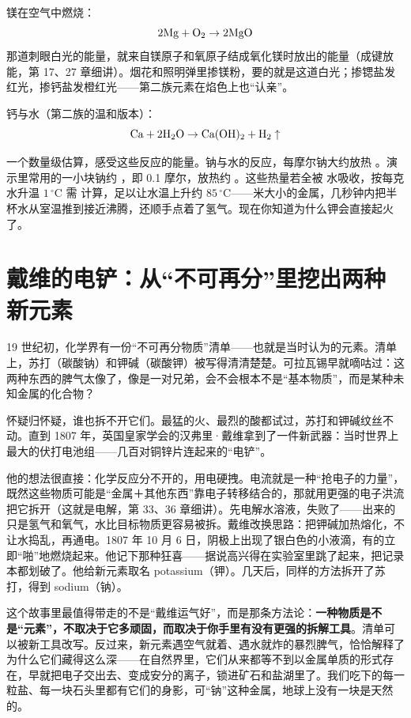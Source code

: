 镁在空气中燃烧：
\[\mathrm{2Mg} + \mathrm{O_2} \rightarrow \mathrm{2MgO}\]
那道刺眼白光的能量，就来自镁原子和氧原子结成氧化镁时放出的能量（成键放能，第 17、27 章细讲）。烟花和照明弹里掺镁粉，要的就是这道白光；掺锶盐发红光，掺钙盐发橙红光——第二族元素在焰色上也“认亲”。

钙与水（第二族的温和版本）：
\[\mathrm{Ca} + \mathrm{2H_2O} \rightarrow \mathrm{Ca(OH)_2} + \mathrm{H_2}\uparrow\]

一个数量级估算，感受这些反应的能量。钠与水的反应，每摩尔钠大约放热 。演示里常用的一小块钠约 ，即 0.1 摩尔，放热约 。这些热量若全被  水吸收，按每克水升温 $1\,^{\circ}\mathrm{C}$ 需  计算，足以让水温上升约 $85\,^{\circ}\mathrm{C}$——米大小的金属，几秒钟内把半杯水从室温推到接近沸腾，还顺手点着了氢气。现在你知道为什么钾会直接起火了。

\section{戴维的电铲：从“不可再分”里挖出两种新元素}

\begin{zhengju}
19 世纪初，化学界有一份“不可再分物质”清单——也就是当时认为的元素。清单上，苏打（碳酸钠）和钾碱（碳酸钾）被写得清清楚楚。可拉瓦锡早就嘀咕过：这两种东西的脾气太像了，像是一对兄弟，会不会根本不是“基本物质”，而是某种未知金属的化合物？

怀疑归怀疑，谁也拆不开它们。最猛的火、最烈的酸都试过，苏打和钾碱纹丝不动。直到 1807 年，英国皇家学会的汉弗里·戴维拿到了一件新武器：当时世界上最大的伏打电池组——几百对铜锌片连起来的“电铲”。

他的想法很直接：化学反应分不开的，用电硬拽。电流就是一种“抢电子的力量”，既然这些物质可能是“金属＋其他东西”靠电子转移结合的，那就用更强的电子洪流把它拆开（这就是电解，第 33、36 章细讲）。先电解水溶液，失败了——出来的只是氢气和氧气，水比目标物质更容易被拆。戴维改换思路：把钾碱加热熔化，不让水捣乱，再通电。1807 年 10 月 6 日，阴极上出现了银白色的小液滴，有的立即“啪”地燃烧起来。他记下那种狂喜——据说高兴得在实验室里跳了起来，把记录本都划破了。他给新元素取名 potassium（钾）。几天后，同样的方法拆开了苏打，得到 sodium（钠）。

这个故事里最值得带走的不是“戴维运气好”，而是那条方法论：\textbf{一种物质是不是“元素”，不取决于它多顽固，而取决于你手里有没有更强的拆解工具}。清单可以被新工具改写。反过来，新元素遇空气就着、遇水就炸的暴烈脾气，恰恰解释了为什么它们藏得这么深——在自然界里，它们从来都等不到以金属单质的形式存在，早就把电子交出去、变成安分的离子，锁进矿石和盐湖里了。我们吃下的每一粒盐、每一块石头里都有它们的身影，可“钠”这种金属，地球上没有一块是天然的。
\end{zhengju}


